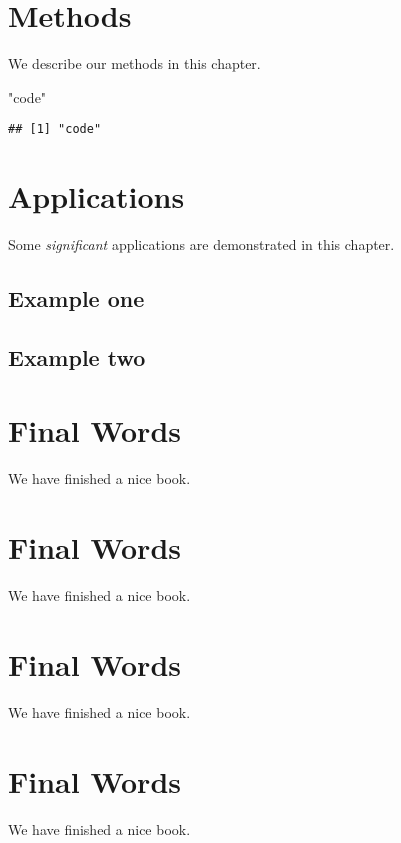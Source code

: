 \documentclass[]{book}
\newenvironment{Shaded}{\begin{snugshade}}{\end{snugshade}}
\newcommand{\StringTok}[1]{\textcolor[rgb]{0.31,0.60,0.02}{#1}}
\theoremstyle{definition}
\theoremstyle{definition}
\theoremstyle{definition}
\theoremstyle{remark}
\begin{document}
\hypertarget{methods}{%
\chapter{Methods}\label{methods}}

We describe our methods in this chapter.

\begin{Shaded}
\begin{Highlighting}[]
\StringTok{"code"}
\end{Highlighting}
\end{Shaded}

\begin{verbatim}
## [1] "code"
\end{verbatim}

\hypertarget{applications}{%
\chapter{Applications}\label{applications}}

Some \emph{significant} applications are demonstrated in this chapter.

\hypertarget{example-one}{%
\section{Example one}\label{example-one}}

\hypertarget{example-two}{%
\section{Example two}\label{example-two}}

\hypertarget{final-words}{%
\chapter{Final Words}\label{final-words}}

We have finished a nice book.

\hypertarget{final-words-1}{%
\chapter{Final Words}\label{final-words-1}}

We have finished a nice book.

\hypertarget{final-words-2}{%
\chapter{Final Words}\label{final-words-2}}

We have finished a nice book.

\hypertarget{final-words-3}{%
\chapter{Final Words}\label{final-words-3}}

We have finished a nice book.


\end{document}
